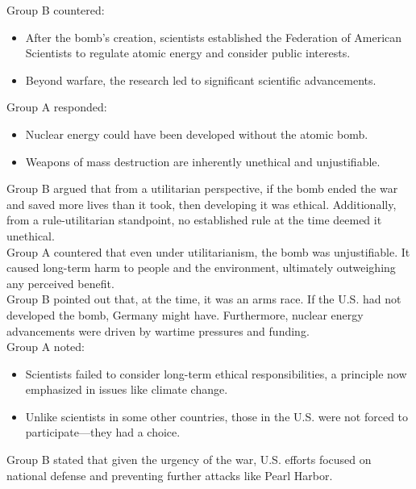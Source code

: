 \documentclass[12pt]{article}
\begin{document}
\noindent Group B countered:  
{\fontsize{11pt}{13pt}\selectfont  
\begin{itemize}  
\setlength{\itemsep}{4pt}   
    \item After the bomb’s creation, scientists established the Federation of American Scientists to regulate atomic energy and consider public interests.  
    \item Beyond warfare, the research led to significant scientific advancements.  
\end{itemize}  
}  

\noindent Group A responded:  
{\fontsize{11pt}{13pt}\selectfont  
\begin{itemize}  
\setlength{\itemsep}{4pt}   
    \item Nuclear energy could have been developed without the atomic bomb.  
    \item Weapons of mass destruction are inherently unethical and unjustifiable.  
\end{itemize}  
}  

\noindent Group B argued that from a utilitarian perspective, if the bomb ended the war and saved more lives than it took, then developing it was ethical. Additionally, from a rule-utilitarian standpoint, no established rule at the time deemed it unethical.\\

\noindent Group A countered that even under utilitarianism, the bomb was unjustifiable. It caused long-term harm to people and the environment, ultimately outweighing any perceived benefit.\\

\noindent Group B pointed out that, at the time, it was an arms race. If the U.S. had not developed the bomb, Germany might have. Furthermore, nuclear energy advancements were driven by wartime pressures and funding.\\ 

\noindent Group A noted:  
{\fontsize{11pt}{13pt}\selectfont  
\begin{itemize}  
\setlength{\itemsep}{4pt}   
    \item Scientists failed to consider long-term ethical responsibilities, a principle now emphasized in issues like climate change.  
    \item Unlike scientists in some other countries, those in the U.S. were not forced to participate—they had a choice.  
\end{itemize}  
}  

\noindent Group B stated that given the urgency of the war, U.S. efforts focused on national defense and preventing further attacks like Pearl Harbor.  
\end{document}

